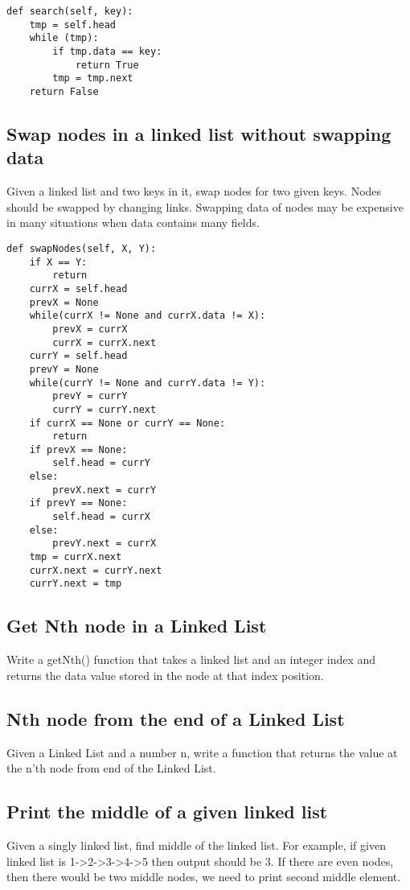 \begin{lstlisting}
def search(self, key):
    tmp = self.head
    while (tmp):
        if tmp.data == key:
            return True
        tmp = tmp.next
    return False
\end{lstlisting}


\subsection{Swap nodes in a linked list without swapping data}
Given a linked list and two keys in it, swap nodes for two given keys. Nodes should be swapped by changing links. Swapping data of nodes may be expensive in many situations when data contains many fields.
\begin{lstlisting}
def swapNodes(self, X, Y):
    if X == Y:
        return 
    currX = self.head
    prevX = None
    while(currX != None and currX.data != X):
        prevX = currX
        currX = currX.next
    currY = self.head
    prevY = None
    while(currY != None and currY.data != Y):
        prevY = currY
        currY = currY.next
    if currX == None or currY == None:
        return 
    if prevX == None:
        self.head = currY
    else:
        prevX.next = currY
    if prevY == None:
        self.head = currX
    else:
        prevY.next = currX
    tmp = currX.next
    currX.next = currY.next
    currY.next = tmp
\end{lstlisting}

\subsection{Get Nth node in a Linked List}
Write a getNth() function that takes a linked list and an integer index and returns the data value stored in the node at that index position.

\subsection{Nth node from the end of a Linked List}
Given a Linked List and a number n, write a function that returns the value at the n’th node from end of the Linked List.

\subsection{Print the middle of a given linked list}
Given a singly linked list, find middle of the linked list. For example, if given linked list is 1->2->3->4->5 then output should be 3. If there are even nodes, then there would be two middle nodes, we need to print second middle element.

